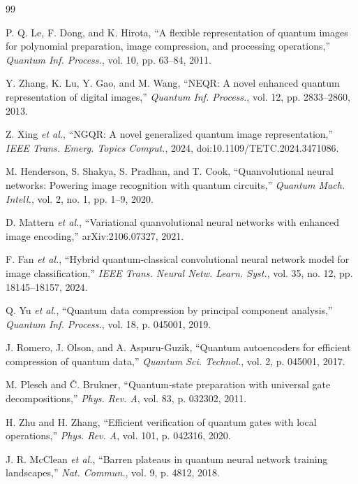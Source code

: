 \documentclass[onecolumn,12pt]{IEEEtran}
\begin{document}

\begin{thebibliography}{99}

P. Q. Le, F. Dong, and K. Hirota,
“A flexible representation of quantum images for polynomial preparation, image compression, and processing operations,”
\textit{Quantum Inf. Process.}, vol. 10, pp. 63–84, 2011.

Y. Zhang, K. Lu, Y. Gao, and M. Wang,
“NEQR: A novel enhanced quantum representation of digital images,”
\textit{Quantum Inf. Process.}, vol. 12, pp. 2833–2860, 2013.

Z. Xing \textit{et al.},
“NGQR: A novel generalized quantum image representation,”
\textit{IEEE Trans. Emerg. Topics Comput.}, 2024,
doi:10.1109/TETC.2024.3471086.

M. Henderson, S. Shakya, S. Pradhan, and T. Cook,
“Quanvolutional neural networks: Powering image recognition with quantum circuits,”
\textit{Quantum Mach. Intell.}, vol. 2, no. 1, pp. 1–9, 2020.

D. Mattern \textit{et al.},
“Variational quanvolutional neural networks with enhanced image encoding,”
arXiv:2106.07327, 2021.

F. Fan \textit{et al.},
“Hybrid quantum-classical convolutional neural network model for image classification,”
\textit{IEEE Trans. Neural Netw. Learn. Syst.}, vol. 35, no. 12, pp. 18145–18157, 2024.

Q. Yu \textit{et al.},
“Quantum data compression by principal component analysis,”
\textit{Quantum Inf. Process.}, vol. 18, p. 045001, 2019.

J. Romero, J. Olson, and A. Aspuru-Guzik,
“Quantum autoencoders for efficient compression of quantum data,”
\textit{Quantum Sci. Technol.}, vol. 2, p. 045001, 2017.

M. Plesch and \v{C}. Brukner,
“Quantum‐state preparation with universal gate decompositions,”
\textit{Phys. Rev. A}, vol. 83, p. 032302, 2011.

H. Zhu and H. Zhang,
“Efficient verification of quantum gates with local operations,”
\textit{Phys. Rev. A}, vol. 101, p. 042316, 2020.

J. R. McClean \textit{et al.},
“Barren plateaus in quantum neural network training landscapes,”
\textit{Nat. Commun.}, vol. 9, p. 4812, 2018.


\end{thebibliography}
\end{document}
